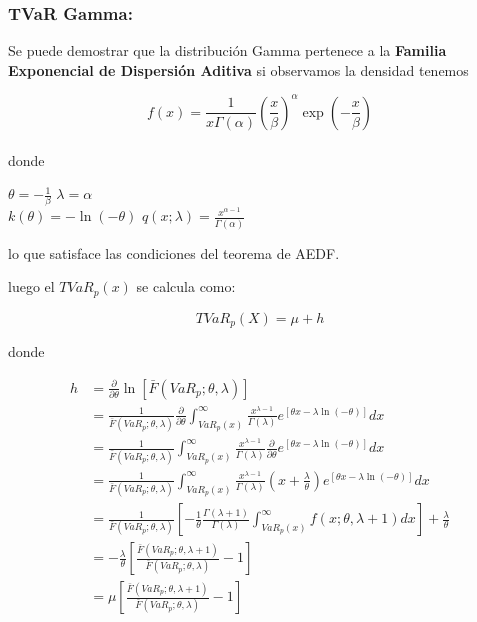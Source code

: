 \documentclass[10pt,]{article}
\begin{document}
\hypertarget{tvar-gamma}{%
\subsubsection{\texorpdfstring{\textbf{TVaR
Gamma:}}{TVaR Gamma:}}\label{tvar-gamma}}

Se puede demostrar que la distribución Gamma pertenece a la
\textbf{Familia Exponencial de Dispersión Aditiva} si observamos la
densidad tenemos

\[f(x)=\frac{1}{x \Gamma(\alpha)} \left(\frac{x}{\beta}\right)^{\alpha} \exp \left(-\frac{x}{\beta}\right)\]\\
donde

\(\theta=-\frac{1}{\beta}\) \(\lambda=\alpha\)\\
\(k(\theta) = -\ln(-\theta)\)
\(q(x;\lambda)=\frac{x^{\alpha-1}}{\Gamma(\alpha)}\)

lo que satisface las condiciones del teorema de AEDF.

luego el \(TVaR_p(x)\) se calcula como:

\[TVaR_p(X)= \mu + h\]

donde

\[\begin{array}{rl}
h &\displaystyle=\frac{\partial}{\partial \theta}\ln[\bar{F}(VaR_p;\theta,\lambda)]\\
&\displaystyle= \frac{1}{\bar{F}(VaR_p;\theta,\lambda)} \frac{\partial}{\partial \theta} \int_{VaR_p(x)}^{\infty} \frac{x^{\lambda-1}}{\Gamma(\lambda)} e^{[\theta x -\lambda \ln(-\theta)]}dx\\
&\displaystyle= \frac{1}{\bar{F}(VaR_p;\theta,\lambda)}  \int_{VaR_p(x)}^{\infty} \frac{x^{\lambda-1}}{\Gamma(\lambda)} \frac{\partial}{\partial \theta}e^{[\theta x -\lambda \ln(-\theta)]}dx\\
&\displaystyle= \frac{1}{\bar{F}(VaR_p;\theta,\lambda)}  \int_{VaR_p(x)}^{\infty} \frac{x^{\lambda-1}}{\Gamma(\lambda)} \left(x + \frac{\lambda}{\theta}\right)e^[\theta x -\lambda \ln(-\theta)]dx\\
&\displaystyle= \frac{1}{\bar{F}(VaR_p;\theta,\lambda)} \left[-\frac{1}{\theta} \frac{\Gamma(\lambda + 1)}{\Gamma(\lambda)} \int_{VaR_p(x)}^{\infty} f(x;\theta, \lambda + 1) dx \right] + \frac{\lambda}{\theta}\\
&\displaystyle= -\frac{\lambda}{\theta} \left[\frac{\bar{F}(VaR_p;\theta,\lambda+1)}{\bar{F}(VaR_p;\theta,\lambda)} - 1\right]\\
&\displaystyle= \mu \left[\frac{\bar{F}(VaR_p;\theta,\lambda+1)}{\bar{F}(VaR_p;\theta,\lambda)} - 1\right]
\end{array}\]
\end{document}
